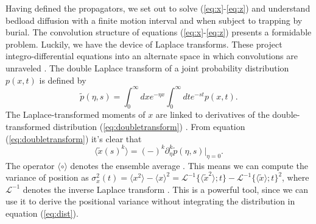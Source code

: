 \documentclass[]{agujournal2018}
\newcommand\be{\begin{equation}}
\newcommand\ee{\end{equation}}
\newcommand\bra{\langle}
\newcommand\ket{\rangle}
\newcommand\El{\mathcal{L}}
\begin{document}
Having defined the propagators, we set out to solve (\ref{eq:x}-\ref{eq:z}) and understand bedload diffusion with a finite motion interval and when subject to trapping by burial.
The convolution structure of equations (\ref{eq:x}-\ref{eq:z}) presents a formidable problem.
Luckily, we have the device of Laplace transforms.
These project integro-differential equations into an alternate space in which convolutions are unraveled \citep[e.g.][]{Arfken1985}.
The double Laplace transform of a joint probability distribution $p(x,t)$ is defined by 
\be \tilde{p}(\eta,s) = \int_0^\infty dx e^{-\eta x}\int_0^\infty dt e^{-st} p(x,t). \label{eq:doubletransform}\ee
The Laplace-transformed moments of $x$ are linked to derivatives of the double-transformed distribution (\ref{eq:doubletransform}) \citep[cf.][]{Berezhkovskii2002}.
From equation (\ref{eq:doubletransform}) it's clear that
\be \bra \tilde{x}(s)^k \ket = (-)^k\partial_\eta^k \tilde{p}(\eta,s)\Big|_{\eta=0}.\label{eq:momenttrick}\ee
The operator $\bra \circ \ket$ denotes the ensemble average \citep[e.g.][]{Kittel1958}.
This means we can compute the variance of position as $\sigma_x^2(t) = \bra x^2 \ket - \bra x \ket^2 = \El^{-1} \{\bra\tilde{x}^2 \ket;t\} - \El^{-1} \{\bra\tilde{x} \ket;t\}^2$, where $\El^{-1}$ denotes the inverse Laplace transform \citep[e.g.][]{Arfken1985}. This is a powerful tool, since we can use it to derive the positional variance without integrating the distribution in equation (\ref{eq:dist}).
\end{document}
